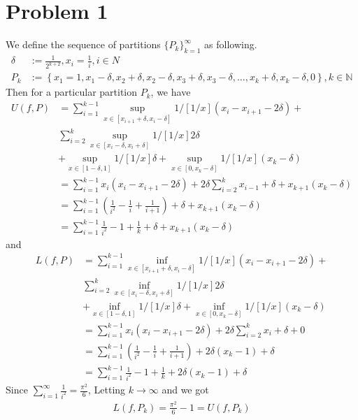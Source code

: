 \documentclass[a4paper]{report}
\begin{document}
\section*{Problem 1}
We define the sequence of partitions ${\{P_k\}}_{k=1}^\infty$ as following. 
\begin{align}
    \delta &:= \frac{1}{2^{k+2}}, x_i = \frac{1}{i}, i \in N\\
    P_k &:= \left\{x_1=1, x_1-\delta, x_2+\delta, x_2-\delta,x_3+\delta,
    x_3-\delta,\ldots,x_k+\delta, x_k-\delta,0\right\},
    k \in \mathbb{N}
\end{align}
Then for a particular partition $P_k$, we have 
\begin{align}
    U(f, P) &= \sum_{i=1}^{k-1} \sup_{x\in [x_{i+1}+\delta, x_i-\delta]}1/[1/x]
            (x_i-x_{i+1} - 2\delta) + \\
        &\sum_{i=2}^k \sup_{x\in [x_i-\delta, x_i+\delta]} 1/[1/x]2\delta\\
        &+ \sup_{x\in [1-\delta,1]}1/[1/x]\delta
        + \sup_{x\in [0, x_k - \delta]}1/[1/x](x_k-\delta)\\
        &= \sum_{i=1}^{k-1} x_i (x_i-x_{i+1} - 2\delta)+2\delta\sum_{i=2}^k x_{i-1}+\delta
            +x_{k+1}(x_k-\delta) \\
        &= \sum_{i=1}^{k-1} \left(\frac{1}{i^2} -\frac{1}{i}+\frac{1}{i+1}\right)+\delta+
            x_{k+1}(x_k-\delta) \\
        &= \sum_{i=1}^{k-1} \frac{1}{i^2} - 1 + \frac{1}{k}+\delta+
        x_{k+1}(x_k-\delta)
\end{align}
and
\begin{align}
    L(f, P) &= \sum_{i=1}^{k-1} \inf_{x\in [x_{i+1}+\delta, x_i-\delta]}1/[1/x]
            (x_i-x_{i+1} - 2\delta) + \\
        &\sum_{i=2}^k \inf_{x\in [x_i-\delta, x_i+\delta]} 1/[1/x]2\delta\\
        &+ \inf_{x\in [1-\delta,1]}1/[1/x]\delta
        + \inf_{x\in [0, x_k - \delta]}1/[1/x](x_k-\delta)\\
        &= \sum_{i=1}^{k-1} x_i (x_i-x_{i+1} - 2\delta)+2\delta\sum_{i=2}^k x_i+\delta
            +0\\
        &= \sum_{i=1}^{k-1} \left(\frac{1}{i^2} -\frac{1}{i}+\frac{1}{i+1}\right)+2\delta
        (x_k-1)+\delta \\
        &= \sum_{i=1}^{k-1} \frac{1}{i^2}-1+\frac{1}{k}+2\delta(x_k-1) + \delta
\end{align}
Since $\sum_{i=1}^\infty \frac{1}{i^2} = \frac{\pi^2}{6}$, Letting $k \to \infty$ and we got 
\begin{align}
    L(f, P_k) = \frac{\pi^2}{6}-1= U(f, P_k)
\end{align}
\end{document}
